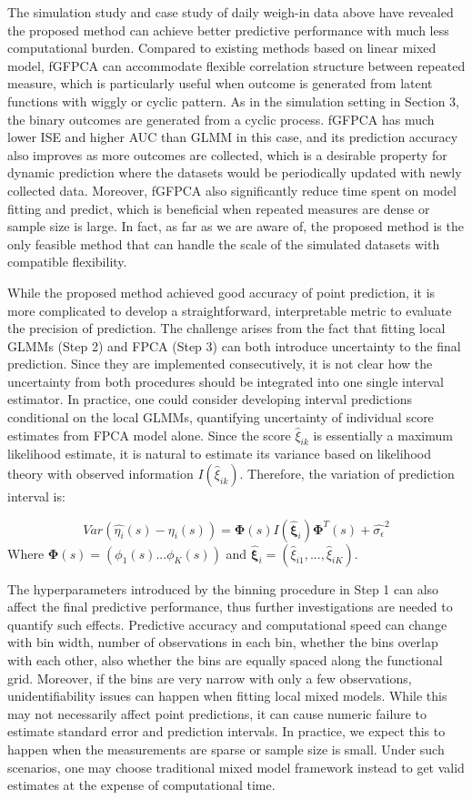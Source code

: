 \documentclass[
  11pt,
]{article}
\begin{document}
The simulation study and case study of daily weigh-in data above have
revealed the proposed method can achieve better predictive performance
with much less computational burden. Compared to existing methods based
on linear mixed model, fGFPCA can accommodate flexible correlation
structure between repeated measure, which is particularly useful when
outcome is generated from latent functions with wiggly or cyclic
pattern. As in the simulation setting in Section 3, the binary outcomes
are generated from a cyclic process. fGFPCA has much lower ISE and
higher AUC than GLMM in this case, and its prediction accuracy also
improves as more outcomes are collected, which is a desirable property
for dynamic prediction where the datasets would be periodically updated
with newly collected data. Moreover, fGFPCA also significantly reduce
time spent on model fitting and predict, which is beneficial when
repeated measures are dense or sample size is large. In fact, as far as
we are aware of, the proposed method is the only feasible method that
can handle the scale of the simulated datasets with compatible
flexibility.

While the proposed method achieved good accuracy of point prediction, it
is more complicated to develop a straightforward, interpretable metric
to evaluate the precision of prediction. The challenge arises from the
fact that fitting local GLMMs (Step 2) and FPCA (Step 3) can both
introduce uncertainty to the final prediction. Since they are
implemented consecutively, it is not clear how the uncertainty from both
procedures should be integrated into one single interval estimator. In
practice, one could consider developing interval predictions conditional
on the local GLMMs, quantifying uncertainty of individual score
estimates from FPCA model alone. Since the score \(\hat{\xi}_{ik}\) is
essentially a maximum likelihood estimate, it is natural to estimate its
variance based on likelihood theory with observed information
\({I}(\hat{\xi}_{ik})\). Therefore, the variation of prediction interval
is:

\[Var(\hat{\eta_i}(s)-\eta_i(s))=\boldsymbol{\Phi}(s)I(\hat{\boldsymbol{\xi}}_i)\boldsymbol{\Phi}^T(s)+\hat{\sigma_{\epsilon}}^2\]
Where \(\boldsymbol{\Phi}(s)=(\phi_1(s)...\phi_K(s))\) and
\(\hat{\boldsymbol{\xi}}_i=(\hat{\xi}_{i1}, ...,\hat{\xi}_{iK})\).

The hyperparameters introduced by the binning procedure in Step 1 can
also affect the final predictive performance, thus further
investigations are needed to quantify such effects. Predictive accuracy
and computational speed can change with bin width, number of
observations in each bin, whether the bins overlap with each other, also
whether the bins are equally spaced along the functional grid. Moreover,
if the bins are very narrow with only a few observations,
unidentifiability issues can happen when fitting local mixed models.
While this may not necessarily affect point predictions, it can cause
numeric failure to estimate standard error and prediction intervals. In
practice, we expect this to happen when the measurements are sparse or
sample size is small. Under such scenarios, one may choose traditional
mixed model framework instead to get valid estimates at the expense of
computational time.
\end{document}
